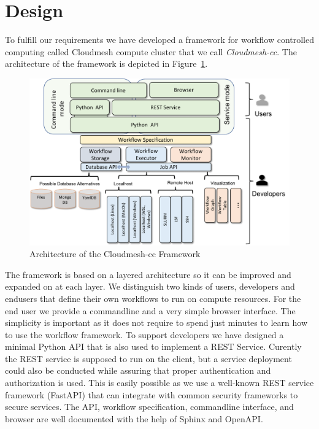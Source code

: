 
\section{Design}

To fulfill our requirements we have developed a framework for workflow
controlled computing called Cloudmesh compute cluster that we call
{\em Cloudmesh-cc}. The architecture of the framework is depicted in
Figure~\ref{fig:arch}.

\begin{figure}[htb]
\centering
\includegraphics[width=1.0\columnwidth]{images/cloudmesh-cc-arch.pdf}
\caption{Architecture of the Cloudmesh-cc Framework}\label{fig:arch}
\end{figure}

The framework is based on a layered architecture so it can be improved
and expanded on at each layer. We distinguish two kinds of users,
developers and endusers that define their own workflows to run on
compute resources. For the end user we provide a commandline and a
very simple browser interface. The simplicity is important as it does
not require to spend just minutes to learn how to use the workflow
framework. To support developers we have designed a minimal Python
API that is also used to implement a REST Service. Curently the REST
service is supposed to run on the client, but a service deployment
could also be conducted while assuring that proper authentication and
authorization is used. This is easily possible as we use a well-known
REST service framework (FastAPI) that can integrate with common
security frameworks to secure services. The API, workflow
specification, commandline interface, and browser are well documented
with the help of Sphinx and OpenAPI.

